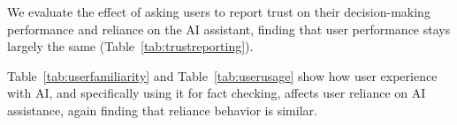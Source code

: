 
We evaluate the effect of asking users to report trust on their decision-making performance and reliance on the AI assistant, finding that user performance stays largely the same (Table~\ref{tab:trustreporting}).



Table~\ref{tab:userfamiliarity} and Table~\ref{tab:userusage} show how user experience with AI, and specifically using it for fact checking, affects user reliance on AI assistance, again finding that reliance behavior is similar.